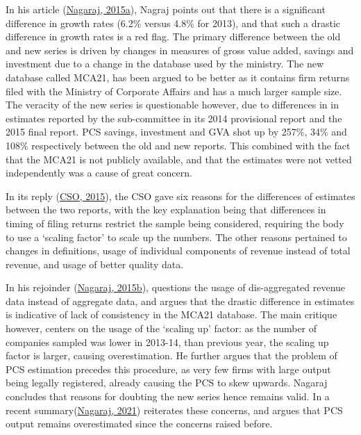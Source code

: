 \documentclass[12pt,nobind, a4paper]{reedthesis}
\begin{document}
 In his article (\protect\hyperlink{ref-nagaraj_seeds_2015-1}{Nagaraj, 2015a}), Nagraj points out that there is a significant difference in growth rates (6.2\% versus 4.8\% for 2013), and that such a drastic difference in growth rates is a red flag. The primary difference between the old and new series is driven by changes in measures of gross value added, savings and investment due to a change in the database used by the ministry. The new database called MCA21, has been argued to be better as it contains firm returns filed with the Ministry of Corporate Affairs and has a much larger sample size. The veracity of the new series is questionable however, due to differences in in estimates reported by the sub-committee in its 2014 provisional report and the 2015 final report. PCS savings, investment and GVA shot up by 257\%, 34\% and 108\% respectively between the old and new reports. This combined with the fact that the MCA21 is not publicly available, and that the estimates were not vetted independently was a cause of great concern.
 \linebreak

 In its reply (\protect\hyperlink{ref-cso_no_2015}{CSO, 2015}), the CSO gave six reasons for the differences of estimates between the two reports, with the key explanation being that differences in timing of filing returns restrict the sample being considered, requiring the body to use a `scaling factor' to scale up the numbers. The other reasons pertained to changes in definitions, usage of individual components of revenue instead of total revenue, and usage of better quality data.
 \linebreak

 In his rejoinder (\protect\hyperlink{ref-nagaraj_seeds_2015}{Nagaraj, 2015b}), questions the usage of dis-aggregated revenue data instead of aggregate data, and argues that the drastic difference in estimates is indicative of lack of consistency in the MCA21 database. The main critique however, centers on the usage of the `scaling up' factor: as the number of companies sampled was lower in 2013-14, than previous year, the scaling up factor is larger, causing overestimation. He further argues that the problem of PCS estimation precedes this procedure, as very few firms with large output being legally registered, already causing the PCS to skew upwards. Nagaraj concludes that reasons for doubting the new series hence remains valid. In a recent summary(\protect\hyperlink{ref-nagaraj_revisiting_2021}{Nagaraj, 2021}) reiterates these concerns, and argues that PCS output remains overestimated since the concerns raised before.
 \linebreak
\end{document}
